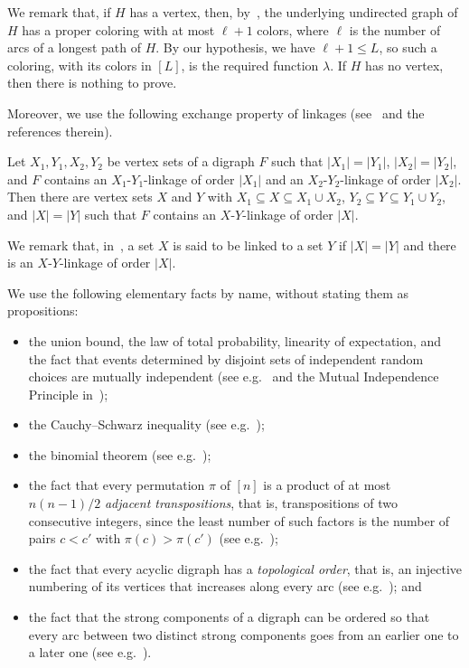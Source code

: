 \documentclass[fontsize=12pt,leading=14pt]{fullpaper}
\begin{document}
We remark that, if $H$ has a vertex, then, by~\cite[Theorem~8.4.1]{BangJensenG02}, the underlying undirected graph of $H$ has a proper coloring with at most $\ell+1$ colors, where $\ell$ is the number of arcs of a longest path of $H$.
By our hypothesis, we have $\ell+1\le L$, so such a coloring, with its colors in $[L]$, is the required function $\lambda$.
If $H$ has no vertex, then there is nothing to prove.

Moreover, we use the following exchange property of linkages (see~\cite[Section~9.6c]{Schrijver03} and the references therein).

\begin{proposition}\label{prop:pym}
  Let $X_1,Y_1,X_2,Y_2$ be vertex sets of a digraph $F$ such that $|X_1|=|Y_1|$, $|X_2|=|Y_2|$, and $F$ contains an $X_1$-$Y_1$-linkage of order $|X_1|$ and an $X_2$-$Y_2$-linkage of order $|X_2|$.
  Then there are vertex sets $X$ and $Y$ with $X_1\subseteq X\subseteq X_1\cup X_2$, $Y_2\subseteq Y\subseteq Y_1\cup Y_2$, and $|X|=|Y|$ such that $F$ contains an $X$-$Y$-linkage of order $|X|$.
\end{proposition}

We remark that, in~\cite[Section~9.6c]{Schrijver03}, a set $X$ is said to be linked to a set $Y$ if $|X|=|Y|$ and there is an $X$-$Y$-linkage of order $|X|$.

We use the following elementary facts by name, without stating them as propositions:
\begin{itemize}
  \item the union bound, the law of total probability, linearity of expectation, and the fact that events determined by disjoint sets of independent random choices are mutually independent (see e.g.~\cite[Lemma~1.2, Theorem~1.6, and Theorem~2.1]{MitzenmacherU05} and the Mutual Independence Principle in~\cite[Section~4.1]{MolloyR02});
  \item the Cauchy--Schwarz inequality (see e.g.~\cite[Chapter~1]{Steele04});
  \item the binomial theorem (see e.g.~\cite[Equation~(5.12)]{GrahamKP94});
  \item the fact that every permutation $\pi$ of $[n]$ is a product of at most $n(n-1)/2$ \emph{adjacent transpositions}, that is, transpositions of two consecutive integers, since the least number of such factors is the number of pairs $c<c'$ with $\pi(c)>\pi(c')$ (see e.g.~\textcite[Proposition~1.5.2]{BjornerBrenti05});
  \item the fact that every acyclic digraph has a \emph{topological order}, that is, an injective numbering of its vertices that increases along every arc (see e.g.~\cite[Proposition~1.4.3]{BangJensenG02}); and
  \item the fact that the strong components of a digraph can be ordered so that every arc between two distinct strong components goes from an earlier one to a later one (see e.g.~\cite[Section~1.5]{BangJensenG02}).
\end{itemize}
\end{document}
